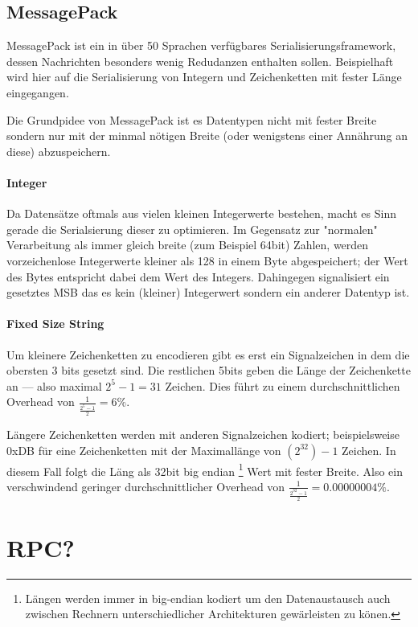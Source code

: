 \subsection{MessagePack}
MessagePack ist ein in {\"{u}}ber 50 Sprachen verf{\"{u}}gbares Serialisierungsframework, dessen Nachrichten besonders wenig Redudanzen enthalten sollen. Beispielhaft wird hier auf die Serialisierung von
Integern und Zeichenketten mit fester L{\"{a}}nge eingegangen.

Die Grundpidee von MessagePack ist es Datentypen nicht mit fester Breite sondern nur mit der minmal n{\"{o}}tigen Breite (oder wenigstens einer Ann{\"{a}}hrung an diese) abzuspeichern.
\paragraph{Integer} Da Datens{\"{a}}tze oftmals aus vielen kleinen Integerwerte bestehen, macht es Sinn gerade die Serialsierung dieser zu optimieren. Im Gegensatz zur "normalen" Verarbeitung als immer gleich breite (zum Beispiel 64bit) Zahlen, werden vorzeichenlose Integerwerte kleiner als 128 in einem Byte abgespeichert; der Wert des Bytes entspricht dabei dem Wert des Integers. Dahingegen signalisiert ein gesetztes MSB das es kein (kleiner) Integerwert sondern ein anderer Datentyp ist.
\paragraph{Fixed Size String} Um kleinere Zeichenketten zu encodieren gibt es erst ein Signalzeichen  in dem die obersten 3 bits gesetzt sind. Die restlichen 5bits geben die L{\"{a}}nge der Zeichenkette an --- also maximal $2^5 - 1 = 31$ Zeichen. Dies f{\"{u}}hrt zu einem durchschnittlichen Overhead von $ \frac{1}{\frac{2^5-1}{2}} = 6\% $.

L{\"{a}}ngere Zeichenketten werden mit anderen Signalzeichen kodiert; beispielsweise 0xDB f{\"{u}}r eine Zeichenketten mit der Maximall{\"{a}}nge von $(2^{32})-1$ Zeichen.
In diesem Fall folgt die L{\"{a}}ng als 32bit big endian
\footnote{L{\"{a}}ngen werden immer in big-endian kodiert um den Datenaustausch auch zwischen Rechnern unterschiedlicher Architekturen gew{\"{a}}rleisten zu k{\"{o}}nen.}
Wert mit fester Breite. Also ein verschwindend geringer durchschnittlicher Overhead von $ \frac{1}{\frac{2^{32}-1}{2}} = 0.00000004\% $.

\clearpage
\section{RPC?}

